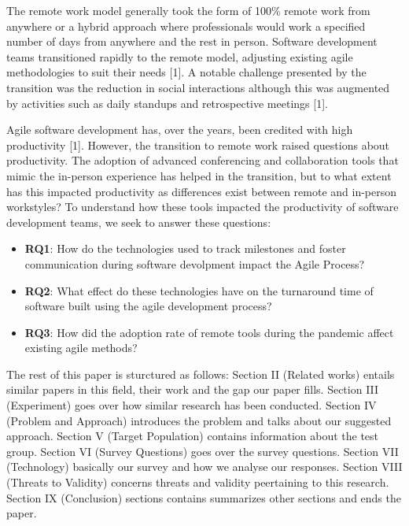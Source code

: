 \documentclass[conference]{IEEEtran}
\begin{document}
The remote work model generally took the form of 100\% remote work from anywhere or a hybrid approach where professionals would work a specified number of days from anywhere and the rest in person. Software development teams transitioned rapidly to the remote model, adjusting existing agile methodologies to suit their needs [1]. A notable challenge presented by the transition was the reduction in social interactions although this was augmented by activities such as daily standups and retrospective meetings [1].

Agile software development has, over the years, been credited with high productivity [1].  However, the transition to remote work raised questions about productivity. The adoption of advanced conferencing and collaboration tools that mimic the in-person experience has helped in the transition, but to what extent has this impacted productivity as differences exist between remote and in-person workstyles? To understand how these tools impacted the productivity of software development teams, we seek to answer these questions:

\begin{itemize}
\item \textbf{RQ1}: How do the technologies used to track milestones and foster communication during software devolpment impact the Agile Process?

\item \textbf{RQ2}: What effect do these technologies have on the turnaround time of software built using the agile development process?

\item \textbf{RQ3}: How did the adoption rate of remote tools during the pandemic affect existing agile methods?
\end{itemize}

The rest of this paper is sturctured as follows: Section II (Related works) entails similar papers in this field, their work and the gap our paper fills. Section III (Experiment) goes over how similar research has been conducted. Section IV (Problem and Approach) introduces the problem and talks about our suggested approach. Section V (Target Population) contains information about the test group. Section VI (Survey Questions) goes over the survey questions. Section VII (Technology) basically our survey and how we analyse our responses. Section VIII (Threats to Validity) concerns threats and validity peertaining to this research. Section IX (Conclusion) sections contains summarizes other sections and ends the paper.
\end{document}
